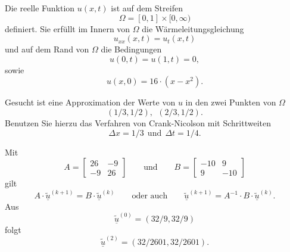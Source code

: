 Die reelle Funktion $u(x,t)$ ist auf dem Streifen
\[
\Omega = [0, 1] \times [0,\infty)
\]
definiert. Sie erfüllt im Innern von $\Omega$ die Wärmeleitungsgleichung
\[
u_{xx}(x,t) = u_{t}(x,t)
\]
und auf dem Rand von $\Omega$ die Bedingungen
\[
u(0,t) = u(1,t) = 0,
\]
sowie
\[
u(x,0) = 16 \cdot (x - x^2).
\]

\vspace{1mm}

Gesucht ist eine Approximation der Werte von $u$ in den zwei Punkten
von $\Omega$
\[
(1/3,1/2), \ \  (2/3,1/2).
\]
Benutzen Sie hierzu das Verfahren von Crank-Nicolson mit Schrittweiten
\[
\Delta x = 1/3 \ \ \mbox{und} \ \  \Delta t = 1/4.
\]

\begin{loesung}
Mit
\[
A = \left[\begin{array}{rr} 26 & -9 \\ -9 & 26 \end{array}\right]
\qquad
\text{und}
\qquad
B = \left[\begin{array}{rr} -10 & 9 \\ 9 & -10 \end{array}\right]
\]
gilt
\[
A \cdot \underline{\tilde u}^{(k+1)} = B \cdot \underline{\tilde u}^{(k)}
\qquad
\text{oder auch}
\qquad
\underline{\tilde u}^{(k+1)} = A^{-1}
\cdot B \cdot \underline{\tilde u}^{(k)}.
\]
Aus 
\[
\underline{\tilde u}^{(0)} = (32/9, 32/9)
\]
folgt
\[
\underline{\tilde u}^{(2)} = (32/2601, 32/2601).
\]
\end{loesung}

